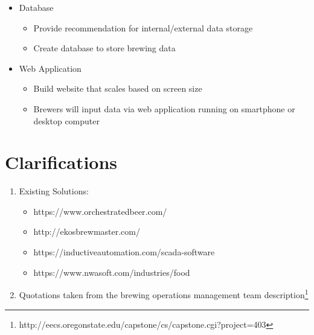 \documentclass[draftclsnofoot,onecolumn,letterpaper,10pt]{IEEEtran}
\begin{document}
\begin{itemize}
	\item {Database}
	\begin{itemize}
		\item {Provide recommendation for internal/external data storage}
		\item {Create database to store brewing data}
	\end{itemize}
	\item{Web Application}
	\begin{itemize}
		\item {Build website that scales based on screen size}
		\item {Brewers will input data via web application running on smartphone or desktop computer}
	\end{itemize}
\end{itemize}

\section{\textbf{Clarifications}}
\begin{enumerate}
	\item {Existing Solutions:}
	\begin{itemize}
		\item {https://www.orchestratedbeer.com/}
		\item {http://ekosbrewmaster.com/}
		\item {https://inductiveautomation.com/scada-software}
		\item {https://www.nwasoft.com/industries/food}
	\end{itemize}
	\item {Quotations taken from the brewing operations management team description\footnote{http://eecs.oregonstate.edu/capstone/cs/capstone.cgi?project=403}}
\end{enumerate}
\end{document}
